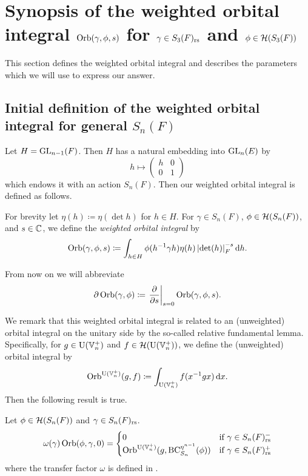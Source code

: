 \section{Synopsis of the weighted orbital integral $\operatorname{Orb}(\gamma, \phi, s)$ for $\gamma \in S_3(F)_{\mathrm{rs}}$ and $\phi \in \mathcal H(S_3(F))$}
\label{ch:orbital0}

This section defines the weighted orbital integral
and describes the parameters which we will use to express our answer.

\subsection{Initial definition of the weighted orbital integral for general $S_n(F)$}
Let $H = \operatorname{GL}_{n-1}(F)$.
Then $H$ has a natural embedding into $\operatorname{GL}_n(E)$ by
\[ h \mapsto \begin{pmatrix} h & 0 \\ 0 & 1 \end{pmatrix} \]
which endows it with an action $S_n(F)$.
Then our weighted orbital integral is defined as follows.
\begin{definition}
  \label{def:orbital0}
  For brevity let $\eta(h) \coloneqq \eta(\det h)$ for $h \in H$.
  For $\gamma \in S_n(F)$, $\phi \in \mathcal H(S_n(F))$, and $s \in \mathbb C$,
  we define the \emph{weighted orbital integral} by
  \[ \Orb(\gamma, \phi, s) \coloneqq
    \int_{h \in H} \phi(h\inv \gamma h) \eta(h)
    \left\lvert \det(h) \right\rvert_F^{-s} \odif h. \]
\end{definition}
\begin{definition}
  From now on we will abbreviate
  \[ \partial \operatorname{Orb}(\gamma, \phi)
    \coloneqq \left. \pdv{}{s} \right\rvert_{s=0} \operatorname{Orb}(\gamma, \phi, s). \]
\end{definition}

We remark that this weighted orbital integral is related to
an (unweighted) orbital integral on the unitary side
by the so-called relative fundamental lemma.
Specifically, for $g \in \operatorname{U}(\mathbb V_n^+)$ and $f \in \mathcal H(\operatorname{U}(\mathbb V_n^+))$,
we define the (unweighted) orbital integral by
\[ \Orb^{\U(\VV_n^+)}(g, f) \coloneqq \int_{\U(\VV_n^+)} f(x^{-1}gx) \odif x. \]
Then the following result is true.
\begin{theorem}
  \label{thm:rel_fundamental_lemma}
  Let $\phi \in \mathcal H(S_n(F))$ and $\gamma \in S_n(F)_{\mathrm{rs}}$.
  \[ \omega(\gamma) \operatorname{Orb}(\phi, \gamma, 0)
    = \begin{cases}
      0 & \text{if }\gamma \in S_n(F)_{\mathrm{rs}}^- \\
      \operatorname{Orb}^{\operatorname{U}(\mathbb V_n^+)}(g, \operatorname{BC}^{\eta^{n-1}}_{S_n}(\phi)) & \text{if } \gamma \in S_n(F)_{\mathrm{rs}}^+
    \end{cases}
  \]
  where the transfer factor $\omega$ is defined in .
\end{theorem}

